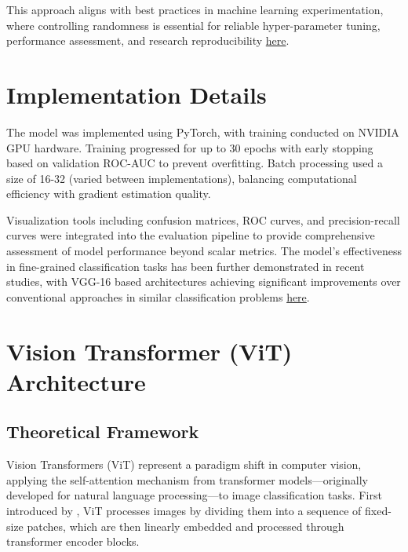 \documentclass[a4paper,12pt]{article}
\begin{document}

This approach aligns with best practices in machine learning experimentation, where controlling randomness is essential for reliable hyper-parameter tuning, performance assessment, and research reproducibility \href{https://ieeexplore.ieee.org/stamp/stamp.jsp?tp=&arnumber=10533638&tag=}{here}.

\section{Implementation Details}
The model was implemented using PyTorch, with training conducted on NVIDIA GPU hardware. Training progressed for up to 30 epochs with early stopping based on validation ROC-AUC to prevent overfitting. Batch processing used a size of 16-32 (varied between implementations), balancing computational efficiency with gradient estimation quality.

Visualization tools including confusion matrices, ROC curves, and precision-recall curves were integrated into the evaluation pipeline to provide comprehensive assessment of model performance beyond scalar metrics. The model's effectiveness in fine-grained classification tasks has been further demonstrated in recent studies, with VGG-16 based architectures achieving significant improvements over conventional approaches in similar classification problems \href{https://ieeexplore.ieee.org/stamp/stamp.jsp?tp=&arnumber=10648677&tag=1}{here}.




\section{Vision Transformer (ViT) Architecture}

\subsection{Theoretical Framework}

Vision Transformers (ViT) represent a paradigm shift in computer vision, applying the self-attention mechanism from transformer models—originally developed for natural language processing—to image classification tasks. First introduced by \citep{dosovitskiy2020image}, ViT processes images by dividing them into a sequence of fixed-size patches, which are then linearly embedded and processed through transformer encoder blocks.
\end{document}
